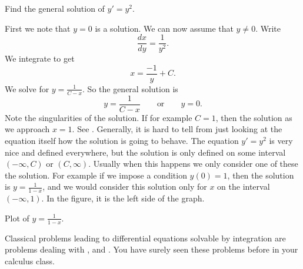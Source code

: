 \begin{example}
Find the general solution of
$y' = y^2$.

First we note that $y=0$ is a solution.  We can now assume that $y \not= 0$.
Write
\begin{equation*}
\frac{dx}{dy} = \frac{1}{y^2} .
\end{equation*}
We integrate to get
\begin{equation*}
x = \frac{-1}{y} + C .
\end{equation*}
We solve for $y = \frac{1}{C-x}$.
So the general solution is
\begin{equation*}
y = \frac{1}{C-x} \qquad \text{or} \qquad y = 0.
\end{equation*}
Note the singularities of the solution.  If for example $C=1$, then the
solution  as we approach $x=1$.  See
.  Generally,
it is hard to tell
from just looking at the equation itself how the solution is going to behave.
The equation $y' = y^2$ is very nice and defined everywhere, but
the solution is only defined on some interval $(-\infty, C)$ or
$(C, \infty)$.  Usually when this happens we only consider one of these
the solution.  For example if we impose a condition $y(0) = 1$, then
the solution is $y=\frac{1}{1-x}$, and we would consider this solution only
for $x$ on the interval $(-\infty,1)$.  In the figure, it is the left side
of the graph.
\begin{myfig}
\capstart
{}
\caption{Plot of $y=\frac{1}{1-x}$.\label{1over1mx:fig}}
\end{myfig}
\end{example}

Classical problems leading to differential equations solvable by integration
are problems 
dealing with ,
 and .  You have surely seen these
problems before in your calculus class.

